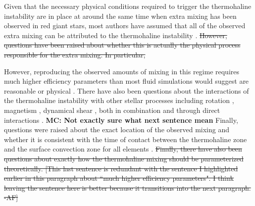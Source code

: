 

Given that the necessary physical conditions required to trigger the thermohaline instability are in place at around the same time when extra mixing has been observed in red giant stars, 
most authors have assumed that all of the observed extra mixing can be attributed to the thermohaline instability \citep[e.g.][]{Kirby2016, Charbonnel2020, Magrini2021a}. %
\sout{However, questions have been raised about whether this is actually the physical process responsible for the extra mixing. In particular,} 

However, reproducing the observed amounts of mixing in this regime requires much higher efficiency parameters than most fluid simulations would suggest are reasonable or physical %
\citep{Denissenkov2010thermohaline, denissenkov_merryfield_2011, traxler_etal_2011, brown_etal_2013}. There have also been questions about the interactions of the thermohaline instability with other stellar processes
including rotation \citep{Lagarde2011}, magnetism \citep{harrington}, 
dynamical shear \citep{CantielloLanger2010}, both in combination and through direct interactions \citep{Maeder2013, SenguptaGaraud2018,harrington}. 
\textbf{MC: Not exactly sure what next sentence mean}
Finally, questions were raised about the exact location of the observed mixing and whether it is consistent with the time of contact between the thermohaline zone and the surface convection zone for all elements \citep[see e.g.][]{Angelou2015, Henkel2017, TayarJoyce22}.
\sout{Finally, there have also been questions about exactly how the thermohaline mixing should be parameterized theoretically. 
[This last sentence is redundant with the sentence I highlighted earlier in this paragraph about ``much higher efficiency parameters". I think leaving the sentence here is better because it transitions into the next paragraph. -AF]}

